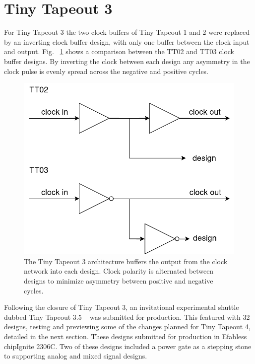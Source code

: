 \section{Tiny Tapeout 3}
\label{sec:tinytapeout3}

For Tiny Tapeout 3 the two clock buffers of Tiny Tapeout 1 and 2 were replaced by an inverting clock buffer design, with only one buffer between the clock input and output. Fig. ~\ref{fig:TT02_vs_TT03} shows a comparison between the TT02 and TT03 clock buffer designs. By inverting the clock between each design any asymmetry in the clock pulse is evenly spread across the negative and positive cycles.

\begin{figure}[!t]
\centering
\includegraphics[width=\columnwidth]{./Figs/tt02 vs tt03 scanchain clock.png}
\caption{The Tiny Tapeout 3 architecture buffers the output from the clock network into each design. Clock polarity is alternated between designs to minimize asymmetry between positive and negative cycles.}
\label{fig:TT02_vs_TT03}
\end{figure}

Following the closure of Tiny Tapeout 3, an invitational experimental shuttle dubbed Tiny Tapeout 3.5 ~\cite{tinytapeout03p5} was submitted for production. This featured with 32 designs, testing and previewing some of the changes planned for Tiny Tapeout 4, detailed in the next section. These designs submitted for production in Efabless chipIgnite 2306C.
Two of these designs included a power gate as a stepping stone to supporting analog and mixed signal designs.

